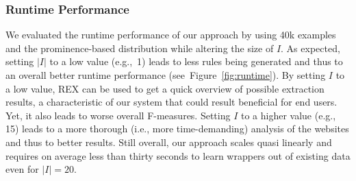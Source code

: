 \documentclass{llncs}
\begin{document}
\subsubsection{Runtime Performance}
We evaluated the runtime performance of our approach by using 40k examples and the prominence-based distribution while altering the size of $I$.
As expected, setting $|I|$ to a low value (e.g.,~1) leads to less rules being generated and thus to an overall better runtime performance (see~Figure~\ref{fig:runtime}).
By setting $I$ to a low value, REX can be used to get a quick overview of possible extraction results, a
characteristic of our system that could result beneficial for end users.
Yet, it also leads to worse overall F-measures.
Setting $I$ to a higher value (e.g., 15) leads to a more thorough (i.e., more time-demanding) analysis of the websites and thus to better results. 
Still overall, our approach scales quasi linearly and requires on average less than thirty seconds to learn wrappers out of existing data even for $|I|=20$.
\end{document}
